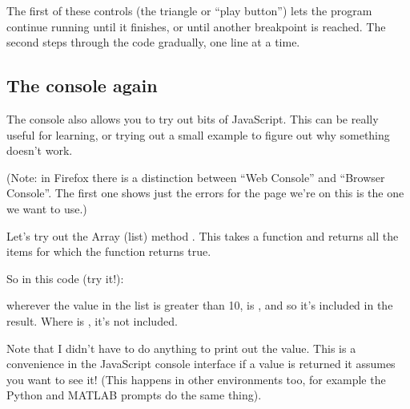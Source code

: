 \documentclass[letterpaper,10pt,english]{sphinxmanual}
\begin{document}
\noindent{}

The first of these controls (the triangle or “play button”)
lets the program continue running until it finishes, or until another breakpoint is reached.
The second steps through the code gradually, one line at a time.


\subsection{The console again}
\label{\detokenize{jspsych_au:the-console-again}}
The console also allows you to try out bits of JavaScript. This can be really
useful for learning, or trying out a small example to figure out why something
doesn’t work.

(Note: in Firefox there is a distinction between “Web Console” and “Browser Console”.
The first one shows just the errors for the page we’re on \textendash{} this is the one we want to use.)

Let’s try out the Array (list) method . This takes a function and returns
all the items for which the function returns true.

So in this code (try it!):

\begin{sphinxVerbatim}[commandchars=\\\{\}]
   \PYG{p}{[}     \PYG{p}{]}
      
\end{sphinxVerbatim}

wherever the value in the list is greater than 10,  is , and
so it’s included in the result. Where  is , it’s not
included.

Note that I didn’t have to do anything to print out the value. This is a
convenience in the JavaScript console interface \textendash{} if a value is returned it
assumes you want to see it! (This happens in other environments too, for example
the Python and MATLAB
prompts do the same thing).
\end{document}

